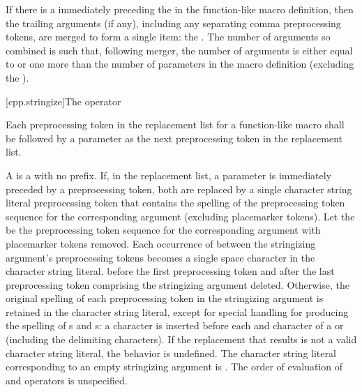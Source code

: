 \documentclass{wg21}
\newcommand{\cwhitespace}[1]{\removed{#1} \added{\grammarterm{whitespace}}}
\begin{document}
\pnum
{}%
If there is a  immediately preceding the \tcode{)} in the
function-like macro
definition, then the trailing arguments (if any), including any separating comma preprocessing
tokens, are merged to form a single item: the . The number of
arguments so combined is such that, following merger, the number of arguments is
either equal to or
one more than the number of parameters in the macro definition (excluding the
).

[cpp.stringize]{The \tcode{\#} operator}%
%

\pnum
Each
\tcode{\#}
preprocessing token in the replacement list for a function-like
macro shall be followed by a parameter as the next preprocessing
token in the replacement list.

\pnum
A  is a  with no prefix.
If, in the replacement list, a parameter is immediately
preceded by a
\tcode{\#}
preprocessing token,
both are replaced by a single character string literal preprocessing token that
contains the spelling of the preprocessing token sequence for the
corresponding argument (excluding placemarker tokens).
Let the  be the preprocessing token sequence
for the corresponding argument with placemarker tokens removed.
Each occurrence of \cwhitespace{whitespace} between the stringizing argument's preprocessing
tokens becomes a single space character in the character string literal.
 \cwhitespace{Whitespace} before the first preprocessing token and after the last
preprocessing token comprising the stringizing argument  deleted.
Otherwise, the original spelling of each preprocessing token in the
stringizing argument is retained in the character string literal,
except for special handling for producing the spelling of
s and s:
a
\tcode{\textbackslash}
character is inserted before each
and
\tcode{\textbackslash}
character of a  or 
(including the delimiting
characters).
If the replacement that results is not a valid character string literal,
the behavior is undefined. The character string literal corresponding to
an empty stringizing argument is .
The order of evaluation of
\tcode{\#}
and
\tcode{\#\#}
operators is unspecified.
\end{document}
